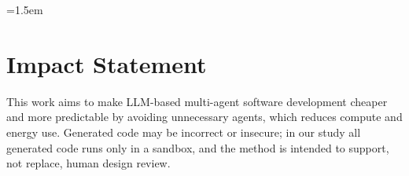 \documentclass{article}
\begin{document}
\emergencystretch=1.5em
\printAffiliationsAndNotice{}

\begin{abstract}

\end{abstract}



\section*{Impact Statement}
This work aims to make LLM-based multi-agent software development cheaper and more predictable by avoiding unnecessary agents, which reduces compute and energy use. Generated code may be incorrect or insecure; in our study all generated code runs only in a sandbox, and the method is intended to support, not replace, human design review.



\newpage
\appendix
\onecolumn

\end{document}
